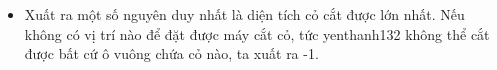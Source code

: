 \begin{itemize}
	\item     Xuất ra một số nguyên duy nhất là diện tích cỏ cắt được lớn nhất. Nếu không có vị trí nào để đặt được máy cắt cỏ, tức    yenthanh132    không thể cắt được bất cứ ô vuông chứa cỏ nào, ta xuất ra -1.   
\end{itemize}